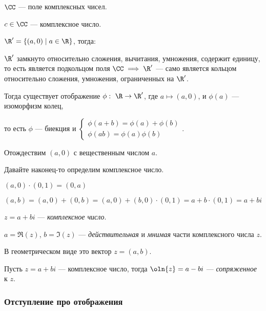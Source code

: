 \begin{defn}
    $\CC$ --- поле комплексных чисел.
\end{defn}

\begin{defn}
    $c \in \CC$ --- комплексное число.
\end{defn}

\begin{theorem-non}
    
    $\R' = \{(a, 0) \mid a \in \R\}$, тогда:
    
    $\R'$ замкнуто относительно сложения, вычитания, умножения, содержит единицу, то есть является подкольцом поля $\CC \implies \R'$ --- само является кольцом относительно сложения, умножения, ограниченных на $\R'$. 
    
    Тогда существует отображение $\phi:\ \R \to \R'$, где $a \mapsto (a, 0)$, и $\phi(a)$ --- изоморфизм колец, 
    
    то есть $\phi$ --- биекция и $\begin{cases}
        \phi(a + b) = \phi(a) + \phi(b) \\
        \phi(ab) = \phi(a)\phi(b)
    \end{cases}$.

    Отождествим $(a, 0)$ с вещественным числом $a$.
\end{theorem-non}

Давайте наконец-то определим комплексное число.

$(a, 0) \cdot (0, 1) = (0, a)$
    
$(a, b) = (a, 0) + (0, b) = (a, 0) + (b, 0) \cdot (0, 1) = a + b \cdot (0, 1) = a + bi$

\begin{defn}
    $z = a + bi$ --- \emph{комплексное число}.

    $a = \Re(z)$, $b = \Im(z)$ --- \emph{действительная} и \emph{мнимая} части комплексного числа $z$.
    
    В геометрическом виде это вектор $z = (a, b)$.
\end{defn}

\begin{defn}
    Пусть $z = a + bi$ --- комплексное число, тогда $\oln{z} = a - bi$ --- \emph{сопряженное} к $z$.
\end{defn}


\subsubsection*{Отступление про отображения}

